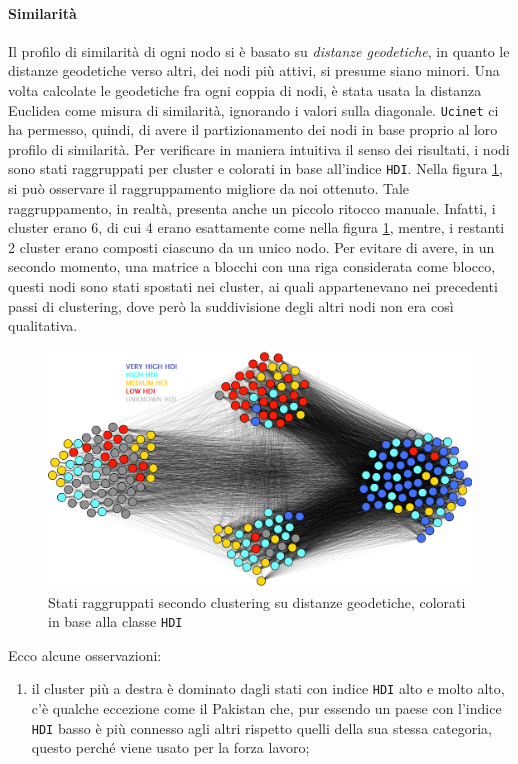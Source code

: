 \documentclass[]{article}
\begin{document}
\begin{multicols}{2}
	\paragraph*{Similarità} Il profilo di similarità di ogni nodo si è basato su \textit{distanze geodetiche}, in quanto le distanze geodetiche verso altri, dei nodi più attivi, si presume siano minori. Una volta calcolate le geodetiche fra ogni coppia di nodi, è stata usata la distanza Euclidea come misura di similarità, ignorando i valori sulla diagonale. \texttt{Ucinet} ci ha permesso, quindi, di avere il partizionamento dei nodi in base proprio al loro profilo di similarità. Per verificare in maniera intuitiva il senso dei risultati, i nodi sono stati raggruppati per cluster e colorati in base all'indice \texttt{HDI}. Nella figura \ref{fig:profiles}, si può osservare il raggruppamento migliore da noi ottenuto. Tale raggruppamento, in realtà, presenta anche un piccolo ritocco manuale. Infatti, i cluster erano 6, di cui 4 erano esattamente come nella figura \ref{fig:profiles}, mentre, i restanti 2 cluster erano composti ciascuno da un unico nodo. Per evitare di avere, in un secondo momento, una matrice a blocchi con una riga considerata come blocco, questi nodi sono stati spostati nei cluster, ai quali appartenevano nei precedenti passi di clustering, dove però la suddivisione degli altri nodi non era così qualitativa. 
	\begin{figure}[t]
		\centering
		\includegraphics[scale=.4]{img/profiles.png}
		\caption{Stati raggruppati secondo clustering su distanze geodetiche, colorati in base alla classe \texttt{HDI}}
		\label{fig:profiles}
	\end{figure}
	Ecco alcune osservazioni:
	\begin{enumerate}
		\item il cluster più a destra è dominato dagli stati con indice \texttt{HDI} alto e molto alto, c'è qualche eccezione come il Pakistan che, pur essendo un paese con l'indice \texttt{HDI} basso è più connesso agli altri rispetto quelli della sua stessa categoria, questo perché viene usato per la forza lavoro;

\end{enumerate}
\end{multicols}
\end{document}

